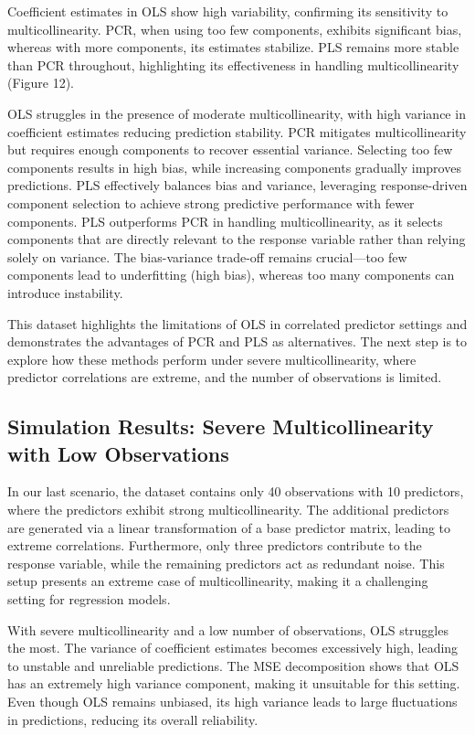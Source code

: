 \documentclass[11pt,twoside,a4paper]{article}
\begin{document}
Coefficient estimates in OLS show high variability, confirming its sensitivity to multicollinearity. PCR, when using too few components, exhibits significant bias, whereas with more components, its estimates stabilize. PLS remains more stable than PCR throughout, highlighting its effectiveness in handling multicollinearity (Figure 12).

OLS struggles in the presence of moderate multicollinearity, with high variance in coefficient estimates reducing prediction stability. PCR mitigates multicollinearity but requires enough components to recover essential variance. Selecting too few components results in high bias, while increasing components gradually improves predictions. PLS effectively balances bias and variance, leveraging response-driven component selection to achieve strong predictive performance with fewer components. PLS outperforms PCR in handling multicollinearity, as it selects components that are directly relevant to the response variable rather than relying solely on variance. The bias-variance trade-off remains crucial—too few components lead to underfitting (high bias), whereas too many components can introduce instability.

This dataset highlights the limitations of OLS in correlated predictor settings and demonstrates the advantages of PCR and PLS as alternatives. The next step is to explore how these methods perform under severe multicollinearity, where predictor correlations are extreme, and the number of observations is limited.

\subsection{Simulation Results: Severe Multicollinearity with Low Observations}  

In our last scenario, the dataset contains only 40 observations with 10 predictors, where the predictors exhibit strong multicollinearity. The additional predictors are generated via a linear transformation of a base predictor matrix, leading to extreme correlations. Furthermore, only three predictors contribute to the response variable, while the remaining predictors act as redundant noise. This setup presents an extreme case of multicollinearity, making it a challenging setting for regression models.

With severe multicollinearity and a low number of observations, OLS struggles the most. The variance of coefficient estimates becomes excessively high, leading to unstable and unreliable predictions. The MSE decomposition shows that OLS has an extremely high variance component, making it unsuitable for this setting. Even though OLS remains unbiased, its high variance leads to large fluctuations in predictions, reducing its overall reliability.
\end{document}
